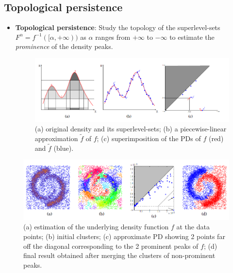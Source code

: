 \documentclass{beamer}
\theoremstyle{definition}
\begin{document}
\subsection{Topological persistence}
\begin{frame}
\begin{itemize}
\item \textbf{Topological persistence}: Study the topology of the superlevel-sets $F^{\alpha} = f^{-1}([\alpha,+\infty))$ as $\alpha$ ranges from $+\infty$ to $-\infty$ to estimate the \emph{prominence} of the density peaks. %
\begin{figure}
\includegraphics[scale=0.6]{density}
\caption{(a) original density and its superlevel-sets; (b) a
piecewise-linear approximation $\tilde{f}$ of $f$; (c) superimposition of the PDs of $f$ (red) and $\tilde{f}$ (blue).} %
\end{figure}
\end{itemize}
\end{frame}

\begin{frame}
\begin{figure}
\includegraphics[scale=0.7]{ex}
\caption{(a) estimation of the underlying density function $f$ at the data points;
(b) initial clusters; (c) approximate PD showing 2 points far off the diagonal
corresponding to the 2 prominent peaks of $f$; (d) final result obtained after merging the clusters of
non-prominent peaks.}
\end{figure}
\end{frame}
\end{document}
